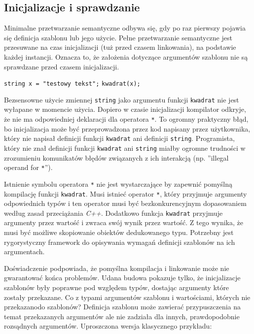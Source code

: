\documentclass[11pt, a4paper]{article}
\begin{document}
\lstset{language=C++}

\subsection{Inicjalizacje i sprawdzanie}

Minimalne przetwarzanie semantyczne odbywa się, gdy po raz pierwszy pojawia się definicja szablonu lub jego użycie. Pełne przetwarzanie semantyczne jest przesuwane na czas inicjalizacji (tuż przed czasem linkowania), na podstawie każdej instancji. Oznacza to, że założenia dotyczące argumentów szablonu nie są sprawdzane przed czasem inicjalizacji.\newline

\noindent \verb#string x = "testowy tekst";# \newline
\verb#kwadrat(x);# \newline

Bezsensowne użycie zmiennej \verb#string# jako argumentu funkcji \verb#kwadrat# nie jest wyłapane w momencie użycia. Dopiero w czasie inicjalizacji kompilator odkryje, że nie ma odpowiedniej deklaracji dla operatora \verb#*#. To ogromny praktyczny błąd, bo inicjalizacja może być przeprowadzona przez kod napisany przez użytkownika, który nie napisał definicji funkcji \verb#kwadrat# ani definicji \verb#string#. Programista, który nie znał definicji funkcji \verb#kwadrat# ani \verb#string# miałby ogromne trudności w zrozumieniu komunikatów błędów związanych z ich interakcją (np. ”illegal operand for \verb#*#”).

Istnienie symbolu operatora \verb#*# nie jest wystarczające by zapewnić pomyślną kompilację funkcji \verb#kwadrat#. Musi istnieć operator \verb#*#, który przyjmuje argumenty odpowiednich typów i ten operator musi być bezkonkurencyjnym dopasowaniem według zasad przeciążania \emph{C++}. Dodatkowo funkcja \verb#kwadrat# przyjmuje argumenty przez wartość i zwraca swój wynik przez wartość. Z tego wynika, że musi być możliwe skopiowanie obiektów dedukowanego typu. Potrzebny jest rygorystyczny framework do opisywania wymagań definicji szablonów na ich argumentach.

Doświadczenie podpowiada, że pomyślna kompilacja i linkowanie może nie gwarantować końca problemów. Udana budowa pokazuje tylko, że inicjalizacje szablonów były poprawne pod względem typów, dostając argumenty które zostały przekazane. Co z typami argumentów szablonu i wartościami, których nie przekazanodo szablonów? Definicja szablonu może zawierać przypuszczenia na temat przekazanych argumentów ale nie zadziała dla innych, prawdopodobnie rozsądnych argumentów. Uproszczona wersja klasycznego przykładu:
\end{document}
